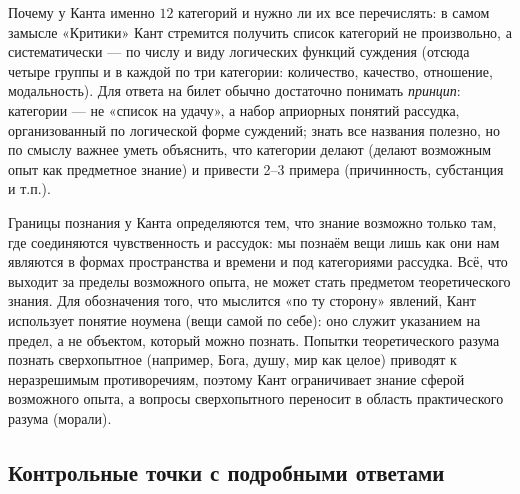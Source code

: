 \documentclass[a4paper,12pt]{article}
\begin{document}
Почему у Канта именно $12$ категорий и нужно ли их все перечислять: в самом замысле «Критики» Кант стремится получить список категорий не произвольно, а систематически — по числу и виду логических функций суждения (отсюда четыре группы и в каждой по три категории: количество, качество, отношение, модальность). Для ответа на билет обычно достаточно понимать \emph{принцип}: категории — не «список на удачу», а набор априорных понятий рассудка, организованный по логической форме суждений; знать все названия полезно, но по смыслу важнее уметь объяснить, что категории делают (делают возможным опыт как предметное знание) и привести 2--3 примера (причинность, субстанция и т.п.).

Границы познания у Канта определяются тем, что знание возможно только там, где соединяются чувственность и рассудок: мы познаём вещи лишь как они нам являются в формах пространства и времени и под категориями рассудка. Всё, что выходит за пределы возможного опыта, не может стать предметом теоретического знания. Для обозначения того, что мыслится «по ту сторону» явлений, Кант использует понятие ноумена (вещи самой по себе): оно служит указанием на предел, а не объектом, который можно познать. Попытки теоретического разума познать сверхопытное (например, Бога, душу, мир как целое) приводят к неразрешимым противоречиям, поэтому Кант ограничивает знание сферой возможного опыта, а вопросы сверхопытного переносит в область практического разума (морали).

\subsection{Контрольные точки с подробными ответами}
\end{document}
